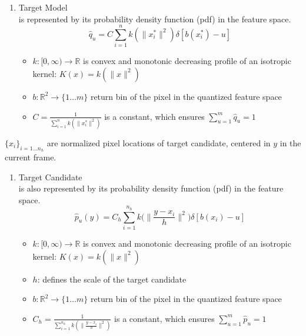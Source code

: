 \documentclass[hyperref={pdfpagelabels=false}]{beamer}
\newcounter{saveenumi}
\newcommand{\conti}{\setcounter{enumi}{\value{saveenumi}}}
\begin{document}
\begin{frame}
\begin{enumerate}\conti
\item Target Model \\
	 is represented by its {\color{darkred} probability density function} (pdf) in the feature space.
	 $$ \hat{q}_u = C \sum_{i=1}^{n}k(\lVert x^{*}_i\rVert^2)\delta[b(x^{*}_i)-u]$$
	 
	 \begin{itemize}
	 \item $k: [0, \infty)\rightarrow \mathbb{R}$ is convex and monotonic decreasing {\color{darkred} profile of an isotropic kernel}: $K(x) = k(\lVert x\rVert^2)$ %
	 
	 \item $b: \mathbb{R}^2 \rightarrow \{1\dots m \}$ return bin of the pixel in the quantized feature space
	 
	 \item $C=\frac{1}{\sum_{i=1}^{n}k(\lVert x^{*}_i\rVert^2)}$ is a constant, which ensures $\sum_{u=1}^{m}\hat{q}_u=1$
	 \end{itemize}
\end{enumerate} 

\end{frame}

\begin{frame}
 $\{x_i\}_{i=1\dots n_h}$ are normalized pixel locations of target candidate, centered in $y$ in the current frame.
\begin{enumerate}\conti
\item Target Candidate \\
	 is also represented by its {\color{darkred} probability density function} (pdf) in the feature space.
	 $$ \hat{p}_u(y) = C_h \sum_{i=1}^{n_h}k\Big(\Big\lVert\frac{ y-x_i}{h}\Big\rVert^2\Big)\delta[b(x_i)-u]$$
	 
	 \begin{itemize}
	 \item $k: [0, \infty)\rightarrow \mathbb{R}$ is convex and monotonic decreasing {\color{darkred} profile of an isotropic kernel}: $K(x) = k(\lVert x\rVert^2)$ %
	 \item $h$: defines the scale of the target candidate
	 
	 \item $b: \mathbb{R}^2 \rightarrow \{1\dots m \}$ return bin of the pixel in the quantized feature space
	 
	 \item $C_h=\frac{1}{\sum_{i=1}^{n_h}k(\lVert \frac{ y-x_i}{h} \rVert^2)}$ is a constant, which ensures $\sum_{u=1}^{m}\hat{p}_u=1$
	 \end{itemize}
\end{enumerate} 

\end{frame}
\end{document}
